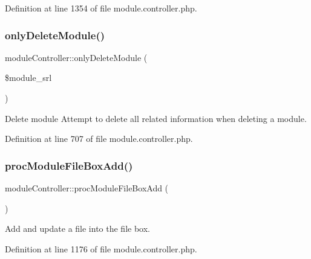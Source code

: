 Definition at line 1354 of file module.\+controller.\+php.

\mbox{\label{classmoduleController_ae34115eaf3d3b4d7621592f7cbfb9c7c}} 
\subsubsection{\texorpdfstring{only\+Delete\+Module()}{onlyDeleteModule()}}
{\footnotesize\ttfamily module\+Controller\+::only\+Delete\+Module (\begin{DoxyParamCaption}\item[{}]{\$module\+\_\+srl }\end{DoxyParamCaption})}

Delete module Attempt to delete all related information when deleting a module. 

Definition at line 707 of file module.\+controller.\+php.

\mbox{\label{classmoduleController_a456022e1fca3a204b9b2b828b501fefb}} 
\subsubsection{\texorpdfstring{proc\+Module\+File\+Box\+Add()}{procModuleFileBoxAdd()}}
{\footnotesize\ttfamily module\+Controller\+::proc\+Module\+File\+Box\+Add (\begin{DoxyParamCaption}{ }\end{DoxyParamCaption})}



Add and update a file into the file box. 



Definition at line 1176 of file module.\+controller.\+php.

\mbox{\label{classmoduleController_a2b4e5ffa008e6a0a00bfe9844f475b0d}} 
